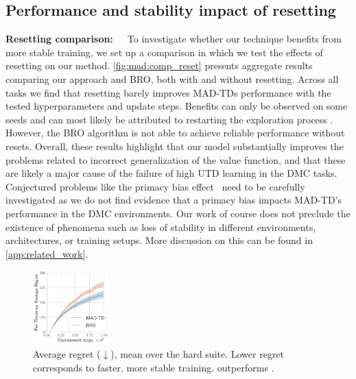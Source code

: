 \subsection{Performance and stability impact of resetting}


\textbf{Resetting comparison:}~~~To investigate whether our technique benefits from more stable training, we set up a comparison in which we test the effects of resetting on our method. \autoref{fig:mad:comp_reset} presents aggregate results comparing our approach and BRO, both with and without resetting. 
Across all tasks we find that resetting barely improves MAD-TDs performance with the tested hyperparameters and update steps.
Benefits can only be observed on some seeds and can most likely be attributed to restarting the exploration process \parencite{hussing2024dissecting}.
However, the BRO algorithm is not able to achieve reliable performance without resets.
Overall, these results highlight that our model substantially improves the problems related to incorrect generalization of the value function, and that these are likely a major cause of the failure of high UTD learning in the DMC tasks.
Conjectured problems like the primacy bias effect~\parencite{nikishin2022primacy} need to be carefully investigated as we do not find evidence that a primacy bias impacts MAD-TD's performance in the DMC environments. 
Our work of course does not preclude the existence of phenomena such as loss of stability in different environments, architectures, or training setups. More discussion on this can be found in \autoref{app:related_work}.
\begin{figure}
    \centering
    \includegraphics[width=0.26\textwidth]{figures/mad-td/average_regret_all_envs.pdf}
    \caption{Average regret ($\downarrow$), mean over the hard suite. Lower regret corresponds to faster, more stable training.  outperforms .}
    \label{fig:mad:regret}    
\end{figure}

